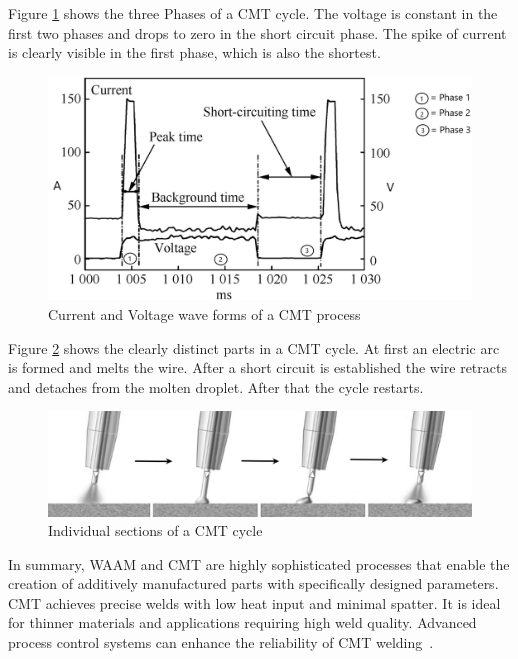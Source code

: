 Figure \ref{fig:CMT} shows the three Phases of a \acrshort{CMT} cycle. The voltage is constant in the first two phases and drops to zero in the short circuit phase. The spike of current is clearly visible in the first phase, which is also the shortest.

\begin{figure}[H]
	\centering
	\includegraphics[width=0.9\linewidth]{figures/CMT.jpg}
	\caption{Current and Voltage wave forms of a CMT process~\cite{Selvi.2018img}}
	\label{fig:CMT}
\end{figure}

\newpage
Figure \ref{fig:CMT2} shows the clearly distinct parts in a \acrshort{CMT} cycle. At first an electric arc is formed and melts the wire. After a short circuit is established  the wire retracts and detaches from the molten droplet. After that the cycle restarts.

\begin{figure}[H]
	\centering
	\includegraphics[width=0.9\linewidth]{figures/CMT2.png}
	\caption{Individual sections of a CMT cycle~\cite{Dalton.30122023}}
	\label{fig:CMT2}
\end{figure}


In summary, \acrshort{WAAM} and \acrshort{CMT} are highly sophisticated processes that enable the creation of additively manufactured parts with specifically designed parameters. \acrshort{CMT} achieves precise welds with low heat input and minimal spatter. It is ideal for thinner materials and applications requiring high weld quality. Advanced process control systems can enhance the reliability of \acrshort{CMT} welding~\cite{Rahul.2018, Pickin.2011}.


